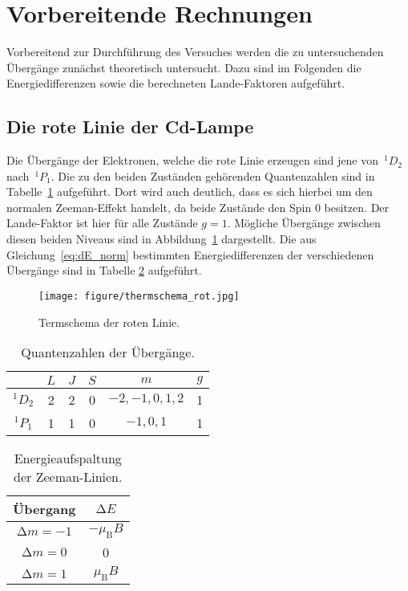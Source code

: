 \section{Vorbereitende Rechnungen}
\label{sec:vorbereitung}
%
Vorbereitend zur Durchführung des Versuches werden die zu untersuchenden Übergänge zunächst theoretisch untersucht. Dazu sind im Folgenden die Energiedifferenzen sowie die berechneten Lande-Faktoren aufgeführt.
%
\subsection{Die rote Linie der Cd-Lampe}
%
Die Übergänge der Elektronen, welche die rote Linie erzeugen sind jene von~$^{1}D_2$ nach~$^{1}P_1$. Die zu den beiden Zuständen gehörenden Quantenzahlen sind in Tabelle~\ref{tab:rot_cd} aufgeführt. Dort wird auch deutlich, dass es sich hierbei um den normalen Zeeman-Effekt handelt, da beide Zustände den Spin $0$ besitzen. Der Lande-Faktor ist hier für alle Zustände $g=1$. Mögliche Übergänge zwischen diesen beiden Niveaus sind in Abbildung~\ref{fig:therm_rot} dargestellt. Die aus Gleichung~\eqref{eq:dE_norm} bestimmten Energiedifferenzen der verschiedenen Übergänge sind in Tabelle \ref{tab:rot_cdE} aufgeführt.
%
\begin{figure}
    \centering
    \texttt{[image: figure/thermschema\_rot.jpg]}
    \caption{Termschema der roten Linie.}
    \label{fig:therm_rot}
\end{figure}
%
\begin{table}[H]
    \centering
    \caption{Quantenzahlen der Übergänge.}
    \begin{tabular}{cccccc}
        \toprule
    {} & {$L$}  & {$J$}  & {$S$} & {$m$} & {$g$} \\
		\midrule
	  $^{1}D_2$ & 2 & 2 & 0 & $-2,-1,0,1,2$ & 1 \\
    $^{1}P_1$ & 1 & 1 & 0 & $-1,0,1$ & 1 \\
    \bottomrule
	\end{tabular}
    \label{tab:rot_cd}
\end{table}
%
\begin{table}[H]
    \centering
    \caption{Energieaufspaltung der Zeeman-Linien.}
    \begin{tabular}{cc}
        \toprule
    {Übergang} & {$\mathup{\Delta}E$} \\
		\midrule
        $\mathup{\Delta}m=-1$ & $-\mu_{\mathup{B}}B$ \\
    $\mathup{\Delta}m=0$ & 0 \\
        $\mathup{\Delta}m=1$ & $\mu_{\mathup{B}}B$ \\
    \bottomrule
	\end{tabular}
    \label{tab:rot_cdE}
\end{table}
%
